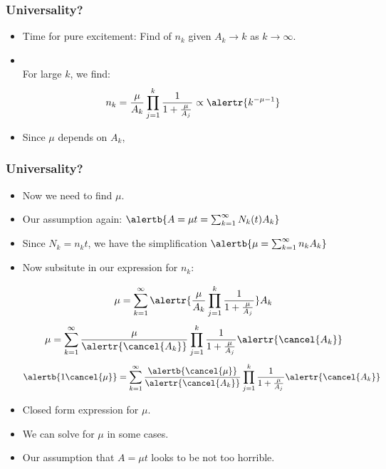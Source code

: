 \begin{frame}
  \frametitle{Universality?}

  \begin{block}{}
  \begin{itemize}
  \item<1->
    Time for pure excitement: Find  
    of $n_k$ given $A_k \rightarrow k$ as $k \rightarrow \infty$.
  \item<2->
    \\
    For large $k$, we find:
    $$
    n_k = 
    \frac{\mu}{A_k}
    \prod_{j=1}^{k}
    \frac{1}{1 + \frac{\mu}{A_j}}
    \propto
    \alertr{ k^{-\mu-1}}
    $$
  \item<3->
    Since $\mu$ depends on $A_k$, 
  \end{itemize}
  \end{block}

\end{frame}

\begin{frame}
  \frametitle{Universality?}

  \begin{block}{}
  \begin{itemize}
  \item<1->
    Now we need to find $\mu$.
  \item<2->
    Our assumption again:
    $
    \alertb{A = \mu t = \sum_{k=1}^{\infty} N_k(t) A_k}
    $
  \item<3->
    Since $N_k = n_k t$, we have the simplification
    $
    \alertb{
    \mu = \sum_{k=1}^{\infty} n_k A_k}
    $
  \item<4->
    Now subsitute in our expression for $n_k$:
    \begin{overprint}
    $$
    \mu = 
    \sum_{k=1}^{\infty} 
    \alertr{
      \frac{\mu}{A_k}
      \prod_{j=1}^{k}
      \frac{1}{1 + \frac{\mu}{A_j}}
    }
    A_k
    $$
    $$
    \mu = 
    \sum_{k=1}^{\infty} 
    \frac{\mu}{\alertr{\cancel{A_k}}}
    \prod_{j=1}^{k}
    \frac{1}{1 + \frac{\mu}{A_j}}
    \alertr{\cancel{A_k}}
    $$
    $$
    \alertb{1 \cancel{\mu}} = 
    \sum_{k=1}^{\infty} 
    \frac{\alertb{\cancel{\mu}}}{\alertr{\cancel{A_k}}}
    \prod_{j=1}^{k}
    \frac{1}{1 + \frac{\mu}{A_j}}
    \alertr{\cancel{A_k}}
    $$
    \end{overprint}
    \item<8->
      Closed form expression for $\mu$.
    \item<9->
      We can solve for $\mu$ in some cases.
    \item<10->
      Our assumption that $A = \mu t$ looks to be not too horrible.
  \end{itemize}
  \end{block}

\end{frame}

